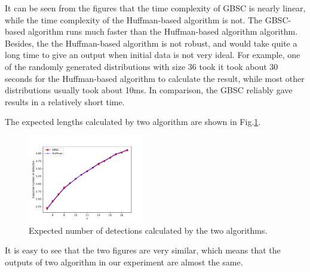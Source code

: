 It can be seen from the figures that the time complexity of GBSC is nearly linear, while the time complexity of the Huffman-based algorithm is not. The GBSC-based algorithm runs much faster than the Huffman-based algorithm algorithm. Besides, the the Huffman-based algorithm is not robust, and would take quite a long time to give an output when initial data is not very ideal. For example, one of the randomly generated distributions with size 36 took it took about 30 seconds for the Huffman-based algorithm to calculate the result, while most other distributions usually took about 10ms. In comparison, the GBSC reliably gave results in a relatively short time.

The expected lengths calculated by two algorithm are shown in Fig.\ref{fig:GBSCvsHuffman}.
\begin{figure}[H]
    \centering
    \includegraphics[width=0.45\textwidth]{figure/BHLength.pdf}
    \caption{Expected number of detections calculated by the two algorithms.}
     \label{fig:GBSCvsHuffman}
\end{figure}
It is easy to see that the two figures are very similar, which means that the outputs of two algorithm in our experiment are almost the same.

